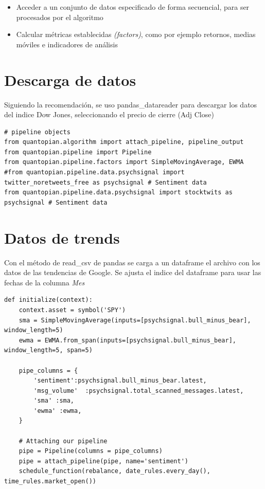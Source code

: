 \documentclass[a4paper, 11pt, twocolumn]{article}
\begin{document}
\begin{itemize}
    \item Acceder a un conjunto de datos especificado de forma secuencial, para ser procesados por el algoritmo
    \item Calcular métricas establecidas \textit{(factors)}, como por ejemplo retornos, medias móviles e indicadores de análisis
\end{itemize}

\section{Descarga de datos}
Siguiendo la recomendación, se uso pandas\_datareader para descargar los datos del indice Dow Jones, seleccionando el precio de cierre (Adj Close)

\lstset{columns=fullflexible, xleftmargin=1cm, basicstyle=\footnotesize, language=Python, breaklines=true, numbers=left} 
\begin{lstlisting}
# pipeline objects
from quantopian.algorithm import attach_pipeline, pipeline_output
from quantopian.pipeline import Pipeline
from quantopian.pipeline.factors import SimpleMovingAverage, EWMA
#from quantopian.pipeline.data.psychsignal import twitter_noretweets_free as psychsignal # Sentiment data
from quantopian.pipeline.data.psychsignal import stocktwits as psychsignal # Sentiment data
\end{lstlisting}

\section{Datos de trends}
Con el método de read\_csv de pandas se carga a un dataframe el archivo con los datos de las tendencias de Google. Se ajusta el indice del dataframe para usar las fechas de la columna \textit{Mes}

\begin{lstlisting}
def initialize(context):
    context.asset = symbol('SPY')
    sma = SimpleMovingAverage(inputs=[psychsignal.bull_minus_bear], window_length=5)
    ewma = EWMA.from_span(inputs=[psychsignal.bull_minus_bear], window_length=5, span=5)
    
    pipe_columns = {
        'sentiment':psychsignal.bull_minus_bear.latest,
        'msg_volume'  :psychsignal.total_scanned_messages.latest,
        'sma' :sma,
        'ewma' :ewma,
    }
    
    # Attaching our pipeline
    pipe = Pipeline(columns = pipe_columns)
    pipe = attach_pipeline(pipe, name='sentiment')
    schedule_function(rebalance, date_rules.every_day(), time_rules.market_open())
\end{lstlisting}
\end{document}

